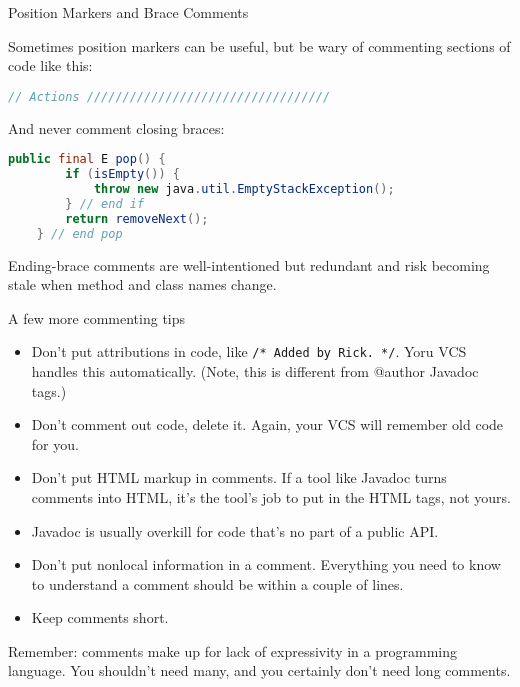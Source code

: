\documentclass{beamer}
\begin{document}
\begin{frame}[fragile]{Position Markers and Brace Comments}


Sometimes position markers can be useful, but be wary of commenting sections of code like this:
\begin{lstlisting}[language=Java]
// Actions //////////////////////////////////
\end{lstlisting}
And never comment closing braces:
\begin{lstlisting}[language=Java]
    public final E pop() {
        if (isEmpty()) {
            throw new java.util.EmptyStackException();
        } // end if
        return removeNext();
    } // end pop
\end{lstlisting}
Ending-brace comments are well-intentioned but redundant and risk becoming stale when method and class names change.

\end{frame}

\begin{frame}[fragile]{A few more commenting tips}

\begin{itemize}
\item Don't put attributions in code, like {\tt /* Added by Rick. */}.  Yoru VCS handles this automatically.  (Note, this is different from @author Javadoc tags.)
\item Don't comment out code, delete it.  Again, your VCS will remember old code for you.
\item Don't put HTML markup in comments.  If a tool like Javadoc turns comments into HTML, it's the tool's job to put in the HTML tags, not yours.
\item Javadoc is usually overkill for code that's no part of a public API.
\item Don't put nonlocal information in a comment.  Everything you need to know to understand a comment should be within a couple of lines.
\item Keep comments short.
\end{itemize}

Remember: comments make up for lack of expressivity in a programming language.  You shouldn't need many, and you certainly don't need long comments.


\end{frame}








\end{document}
